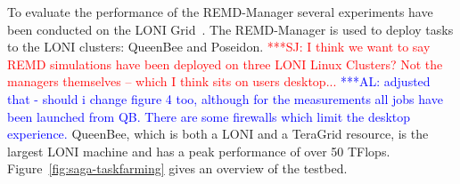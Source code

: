 \documentclass[conference,final]{IEEEtran}
\newcommand{\alnote}[1]{ {\textcolor{blue} { ***AL: #1 }}}
\newcommand{\jhanote}[1]{ {\textcolor{red} { ***SJ: #1 }}}
\newcommand{\alnote}[1]{}
\newcommand{\jhanote}[1]{}
\newcommand{\up}{\vspace*{-1em}}
\begin{document}


%      
%  
\up
{}
\label{sec:exp}       
        
\up To evaluate the performance of the REMD-Manager several
experiments have been conducted on the LONI Grid~\cite{Allen:2003xy}. The
REMD-Manager is used to deploy tasks to the LONI clusters: QueenBee and Poseidon.  
\jhanote{I think we want to say REMD simulations
  have been deployed on three LONI Linux Clusters? Not the managers
  themselves -- which I think sits on users desktop...}
\alnote{adjusted that - should i change figure 4 too, although for the
  measurements all jobs have been launched from QB. There are some
  firewalls which limit the desktop experience.}          
QueenBee, which is both a LONI and a TeraGrid resource, is the largest LONI
machine and has a peak performance of over 50 TFlops.
Figure~\ref{fig:saga-taskfarming} gives an overview of the testbed.
\end{document}
